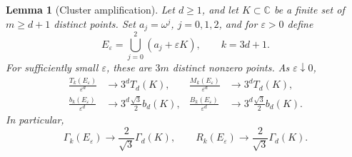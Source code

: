 \documentclass[11pt,a4paper]{article}
\newtheorem{lemma}[theorem]{Lemma}
\theoremstyle{remark}
\newcommand{\C}{\mathbb C}
\newcommand{\eps}{\varepsilon}
\newcommand{\om}{\omega}
\begin{document}
\begin{lemma}[Cluster amplification]\label{lem:amplification}
Let $d\ge1$, and let $K\subset\C$ be a finite set of $m\ge d+1$ distinct points.
Set $a_j=\om^j$, $j=0,1,2$, and for $\eps>0$ define
\[
 E_\eps=\bigcup_{j=0}^2(a_j+\eps K),\qquad k=3d+1.
\]
For sufficiently small $\eps$, these are $3m$ distinct nonzero points. As
$\eps\downarrow0$,
\begin{align}
 \frac{T_k(E_\eps)}{\eps^d}&\longrightarrow3^dT_d(K),&
 \frac{M_k(E_\eps)}{\eps^d}&\longrightarrow3^dT_d(K),\label{eq:full-limits}\\
 \frac{b_k(E_\eps)}{\eps^d}&\longrightarrow
       3^d\frac{\sqrt3}{2}b_d(K),&
 \frac{B_k(E_\eps)}{\eps^d}&\longrightarrow
       3^d\frac{\sqrt3}{2}b_d(K).\label{eq:subset-limits}
\end{align}
In particular,
\begin{equation}\label{eq:amplified-ratios}
 \Gamma_k(E_\eps)\longrightarrow\frac2{\sqrt3}\Gamma_d(K),
 \qquad R_k(E_\eps)\longrightarrow\frac2{\sqrt3}\Gamma_d(K).
\end{equation}
\end{lemma}
\end{document}

